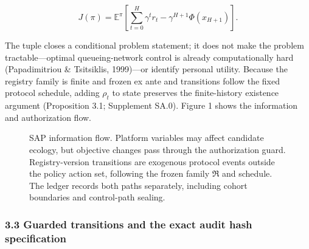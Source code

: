 \documentclass[
  11pt]{article}
\begin{document}
\[J(\pi)=\mathbb E^\pi\!\left[\sum_{t=0}^{H}\gamma^t r_t-\gamma^{H+1}\Phi(x_{H+1})\right].\tag{2}\]

The tuple closes a conditional problem statement; it does not make the
problem tractable---optimal queueing-network control is already
computationally hard (Papadimitriou \& Tsitsiklis, 1999)---or identify
personal utility. Because the registry family is finite and frozen ex
ante and transitions follow the fixed protocol schedule, adding
\(\rho_t\) to state preserves the finite-history existence argument
(Proposition 3.1; Supplement SA.0). Figure 1 shows the information and
authorization flow.

\begin{figure}[htbp]
\centering
{}
\caption{SAP information flow. Platform variables may affect candidate ecology, but objective changes pass through the authorization guard. Registry-version transitions are exogenous protocol events outside the policy action set, following the frozen family $\mathfrak R$ and schedule. The ledger records both paths separately, including cohort boundaries and control-path sealing.}
\label{fig:sap-flow}
\end{figure}

\subsubsection{3.3 Guarded transitions and the exact audit hash
specification}\label{guarded-transitions-and-the-exact-audit-hash-specification}
\end{document}
